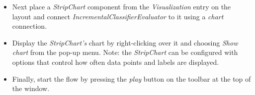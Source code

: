 \begin{itemize}
        \item Next place a \textit{StripChart} component from the \textit{Visualization}
        entry on the layout and connect \textit{IncrementalClassifierEvaluator} to it
        using a \textit{chart} connection.

        \item Display the \textit{StripChart's} chart by right-clicking over it and choosing
        \textit{Show chart} from the pop-up menu. Note: the \textit{StripChart} can be configured
        with options that control how often data points and labels are displayed.

        \item Finally, start the flow by pressing the \textit{play} button on the toolbar at the top of the window.        
\end{itemize}

